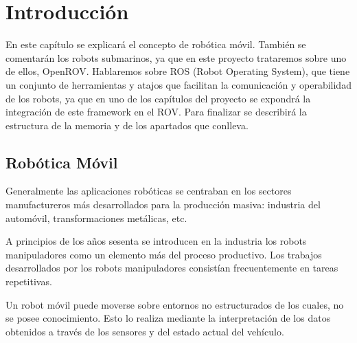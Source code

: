 \chapter{Introducción}

En este capítulo se explicará el concepto de robótica móvil\cite{RoboticaMovil}.
También se comentarán los robots submarinos, ya que en este proyecto trataremos sobre uno de ellos, OpenROV.
Hablaremos sobre ROS (Robot Operating System), que tiene un conjunto de herramientas y atajos que facilitan la comunicación y operabilidad de los robots, ya que en uno de los capítulos del proyecto se expondrá la integración de este framework en el ROV.
Para finalizar se describirá la estructura de la memoria y de los apartados que conlleva.

\section{Robótica Móvil}
\label{cap:roboticamovil}
Generalmente las aplicaciones robóticas se centraban en los sectores manufactureros más desarrollados para la producción masiva: industria del automóvil, transformaciones metálicas, etc.

A principios de los años sesenta se introducen en la industria los robots manipuladores como un elemento más del proceso productivo. Los trabajos desarrollados por los robots manipuladores consistían frecuentemente en tareas repetitivas.

Un robot móvil puede moverse sobre entornos no estructurados de los cuales, no se posee conocimiento. Esto lo realiza mediante la interpretación de los datos obtenidos a través de los sensores y del estado actual del vehículo. 

